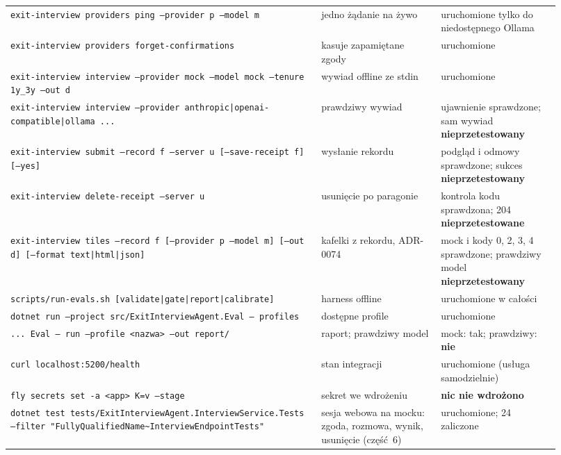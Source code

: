 {\begin{center}
\begin{longtable}{@{}>{\raggedright\arraybackslash}p{0.52\linewidth}>{\raggedright\arraybackslash}p{0.2\linewidth}>{\raggedright\arraybackslash}p{0.2\linewidth}@{}}
\texttt{exit-\allowbreak{}interview providers ping --provider p --model m} & jedno żądanie na żywo & uruchomione tylko do niedostępnego Ollama \\
\texttt{exit-\allowbreak{}interview providers forget-\allowbreak{}confirmations} & kasuje zapamiętane zgody & uruchomione \\
\texttt{exit-\allowbreak{}interview interview --provider mock --model mock --tenure 1y\_\allowbreak{}3y --out d} & wywiad offline ze stdin & uruchomione \\
\texttt{exit-\allowbreak{}interview interview --provider anthropic|openai-\allowbreak{}compatible|ollama ...} & prawdziwy wywiad & ujawnienie sprawdzone; sam wywiad \textbf{nieprzetestowany} \\
\texttt{exit-\allowbreak{}interview submit --record f --server u [--save-\allowbreak{}receipt f] [--yes]} & wysłanie rekordu & podgląd i odmowy sprawdzone; sukces \textbf{nieprzetestowany} \\
\texttt{exit-\allowbreak{}interview delete-\allowbreak{}receipt --server u} & usunięcie po paragonie & kontrola kodu sprawdzona; 204 \textbf{nieprzetestowane} \\
\texttt{exit-\allowbreak{}interview tiles --record f [--provider p --model m] [--out d] [--format text|html|json]} & kafelki z rekordu, ADR-0074 & mock i kody 0, 2, 3, 4 sprawdzone; prawdziwy model \textbf{nieprzetestowany} \\
\texttt{scripts/\allowbreak{}run-\allowbreak{}evals.\allowbreak{}sh [validate|gate|report|calibrate]} & harness offline & uruchomione w całości \\
\texttt{dotnet run --project src/\allowbreak{}ExitInterviewAgent.\allowbreak{}Eval -- profiles} & dostępne profile & uruchomione \\
\texttt{... Eval -- run --profile <nazwa> --out report/\allowbreak{}} & raport; prawdziwy model & mock: tak; prawdziwy: \textbf{nie} \\
\texttt{curl localhost:\allowbreak{}5200/\allowbreak{}health} & stan integracji & uruchomione (usługa samodzielnie) \\
\texttt{fly secrets set -a <app> K=v --stage} & sekret we wdrożeniu & \textbf{nic nie wdrożono} \\
\texttt{dotnet test tests/\allowbreak{}ExitInterviewAgent.\allowbreak{}InterviewService.\allowbreak{}Tests --filter "FullyQualifiedName\textasciitilde{}InterviewEndpointTests"} & sesja webowa na mocku: zgoda, rozmowa, wynik, usunięcie (część~6) & uruchomione; 24 zaliczone \\

\end{longtable}
\end{center}}
